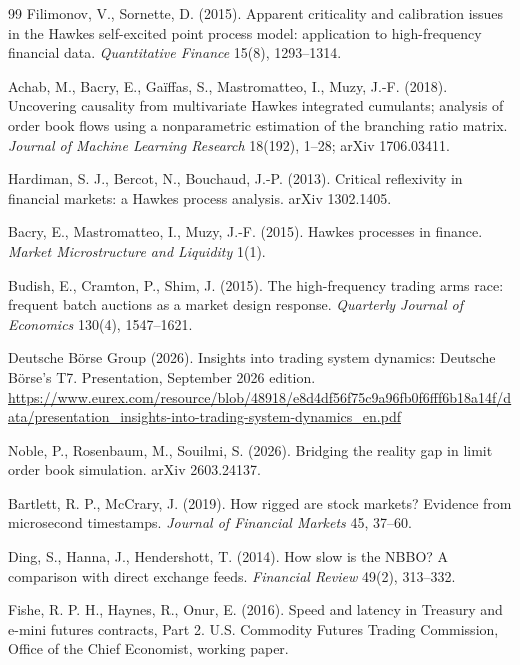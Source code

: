 \documentclass[11pt]{article}
\begin{document}
\begin{thebibliography}{99}
Filimonov, V., Sornette, D. (2015). Apparent criticality and calibration issues in the
Hawkes self-excited point process model: application to high-frequency financial data.
\textit{Quantitative Finance} 15(8), 1293--1314.

Achab, M., Bacry, E., Ga\"iffas, S., Mastromatteo, I., Muzy, J.-F. (2018). Uncovering
causality from multivariate Hawkes integrated cumulants; analysis of order book flows using
a nonparametric estimation of the branching ratio matrix. \textit{Journal of Machine
Learning Research} 18(192), 1--28; arXiv 1706.03411.

Hardiman, S. J., Bercot, N., Bouchaud, J.-P. (2013). Critical reflexivity in financial
markets: a Hawkes process analysis. arXiv 1302.1405.

Bacry, E., Mastromatteo, I., Muzy, J.-F. (2015). Hawkes processes in finance.
\textit{Market Microstructure and Liquidity} 1(1).

Budish, E., Cramton, P., Shim, J. (2015). The high-frequency trading arms race: frequent
batch auctions as a market design response. \textit{Quarterly Journal of Economics}
130(4), 1547--1621.

Deutsche B\"orse Group (2026). Insights into trading system dynamics: Deutsche B\"orse's
T7. Presentation, September 2026 edition.
\url{https://www.eurex.com/resource/blob/48918/e8d4df56f75c9a96fb0f6fff6b18a14f/data/presentation_insights-into-trading-system-dynamics_en.pdf}

Noble, P., Rosenbaum, M., Souilmi, S. (2026). Bridging the reality gap in limit order
book simulation. arXiv 2603.24137.

Bartlett, R. P., McCrary, J. (2019). How rigged are stock markets? Evidence from
microsecond timestamps. \textit{Journal of Financial Markets} 45, 37--60.

Ding, S., Hanna, J., Hendershott, T. (2014). How slow is the NBBO? A comparison with
direct exchange feeds. \textit{Financial Review} 49(2), 313--332.

Fishe, R. P. H., Haynes, R., Onur, E. (2016). Speed and latency in Treasury and e-mini
futures contracts, Part 2. U.S. Commodity Futures Trading Commission, Office of the Chief
Economist, working paper.


\end{thebibliography}
\end{document}
